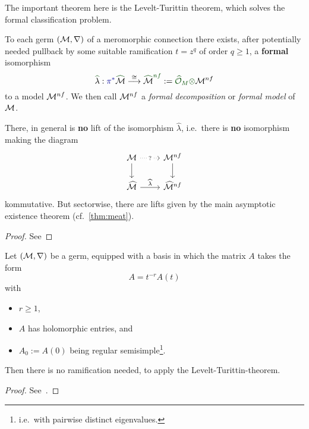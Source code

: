 The important theorem here is the Levelt-Turittin theorem, which solves the
formal classification problem.
\begin{thm}\label{thm:leveltTurittin}
  To each germ $(\mathcal{M},\nabla)$ of a meromorphic connection there exists, after
  potentially needed \textcolor{blue!60!black}{pullback by some suitable
  ramification $t=z^q$ of order $q\geq1$}, a
  \textcolor{green!30!black}{\textbf{formal}} isomorphism
  \[
    \textcolor{green!30!black}{\hat{\textcolor{black}{\lambda}}}:
    \textcolor{blue!60!black}{\pi^{*}}
    \textcolor{green!30!black}{\hat{\textcolor{black}{\cM}}}
    \overset{\cong}\longrightarrow
    \textcolor{green!30!black}{\hat{\textcolor{black}{\cM}}^{nf}}
    :=\textcolor{green!30!black}{\hat\cO_M\otimes}\cM^{nf}
  \]
  to a model $\mathcal{M}^{nf}$.
  We then call $\mathcal{M}^{nf}$ a \emph{formal decomposition} or \emph{formal model}
  of $\mathcal{M}$.
  \begin{rem}
    There, in general is \textbf{no} lift of the isomorphism $\hat\lambda$,
    i.e.\ there is \textbf{no} isomorphism making the diagram
    \[ \begin{tikzcd}
        \cM \dar \arrow[dotted]{r}[description]{?} & \cM^{nf} \dar
        \\\hat\cM \rar{\hat\lambda} & \hat\cM^{nf}
    \end{tikzcd} \]
    kommutative. But sectorwise, there are lifts given by the main asymptotic
    existence theorem (cf.\ \ref{thm:meat}).
  \end{rem}
\end{thm}
\begin{proof}
  See \TODO{}
\end{proof}
\begin{prop}
  Let $(\mathcal{M},\nabla)$ be a germ, equipped with a basis in which the matrix $A$
  takes the form
  \[
    A=t^{-r}A(t)
  \]
  with
  \begin{itemize}
    \item $r\geq1$,
    \item $A$ has holomorphic entries, and
    \item $A_0:=A(0)$ being regular semisimple\footnote{i.e.\ with
      pairwise distinct eigenvalues.}.
  \end{itemize}
  Then there is no ramification needed, to apply the Levelt-Turittin-theorem.
  \begin{comment}
    Further, all the summands $\cR_\phi$ have rank one, which is not the case
    in general.
  \end{comment}
\end{prop}
\begin{proof}
  See~\cite[Thm.II.5.7]{sabbah2007isomonodromic}.
\end{proof}

